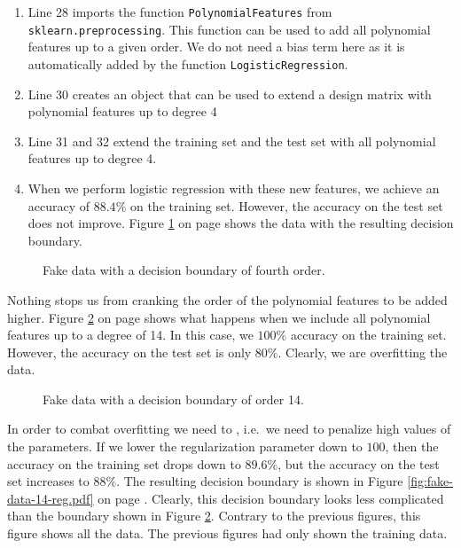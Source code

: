 \begin{enumerate}
\item Line 28 imports the function \texttt{PolynomialFeatures} from \texttt{sklearn.preprocessing}.
      This function can be used to add all polynomial features up to a given order.
      We do not need a bias term here as it is automatically added by the function \texttt{LogisticRegression}.
\item Line 30 creates an object that can be used to extend a design matrix with polynomial features up to degree 4
\item Line 31 and 32 extend the training set and the test set with all polynomial features up to degree 4.
\item When we perform logistic regression with these new features, we achieve an accuracy of $88.4\%$ on the
      training set.  However, the accuracy on the test set does not improve.
      Figure \ref{fig:fake-data-quartic.pdf} on page \pageref{fig:fake-data-quartic.pdf} shows the data with
      the resulting decision boundary.
\end{enumerate}
 
\begin{figure}[!th]
\caption{Fake data with a decision boundary of fourth order.}
\label{fig:fake-data-quartic.pdf}
\end{figure}

Nothing stops us from cranking the order of the polynomial features to be added higher.
Figure \ref{fig:fake-data-14.pdf} on page \pageref{fig:fake-data-14.pdf} shows what happens when we include all
polynomial features up to a degree of 14.  In this case, we $100\%$ accuracy on the training set.  However, the
accuracy on the test set is only $80\%$.  Clearly, we are overfitting the data.

\begin{figure}[!th]
\caption{Fake data with a decision boundary of order 14.}
\label{fig:fake-data-14.pdf}
\end{figure}

In order to combat overfitting we need to , i.e.~we need to penalize high values of the
parameters.  If we lower the regularization parameter down to $100$, then the accuracy on the training set
drops down to $89.6\%$, but the accuracy on the test set increases to $88\%$.  The resulting decision boundary
is shown in Figure \ref{fig:fake-data-14-reg.pdf} on page \pageref{fig:fake-data-14-reg.pdf}.  Clearly, this
decision boundary looks less complicated than the boundary shown in Figure \ref{fig:fake-data-14.pdf}.
Contrary to the previous figures, this figure shows all the data.  The previous figures had only shown the
training data.

